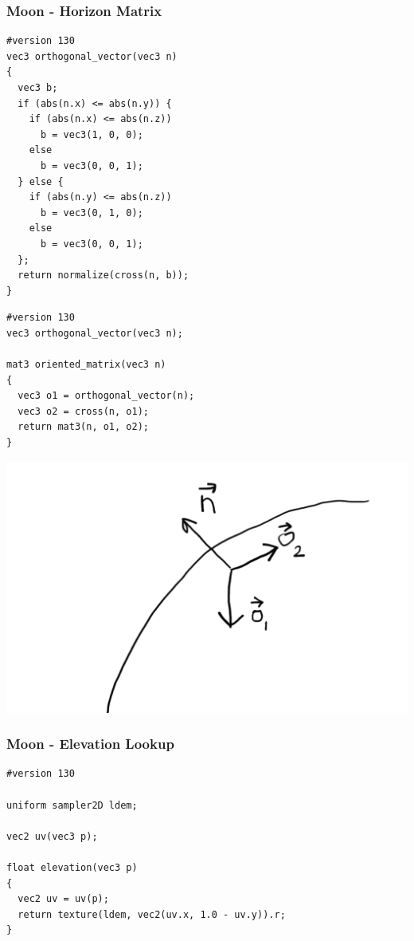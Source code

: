 \documentclass[aspectratio=169,11pt,xcolor=dvipsnames]{beamer}
\begin{document}
\begin{frame}[fragile]
  \frametitle{Moon {-} Horizon Matrix}
  \begin{minipage}[t]{.48\textwidth}
    \begin{verbatim}
#version 130
vec3 orthogonal_vector(vec3 n)
{
  vec3 b;
  if (abs(n.x) <= abs(n.y)) {
    if (abs(n.x) <= abs(n.z))
      b = vec3(1, 0, 0);
    else
      b = vec3(0, 0, 1);
  } else {
    if (abs(n.y) <= abs(n.z))
      b = vec3(0, 1, 0);
    else
      b = vec3(0, 0, 1);
  };
  return normalize(cross(n, b));
}
    \end{verbatim}
  \end{minipage}
  \begin{minipage}[t]{.48\textwidth}
    \begin{verbatim}
#version 130
vec3 orthogonal_vector(vec3 n);

mat3 oriented_matrix(vec3 n)
{
  vec3 o1 = orthogonal_vector(n);
  vec3 o2 = cross(n, o1);
  return mat3(n, o1, o2);
}
    \end{verbatim}
    \begin{center}
      \includegraphics[width=.6\textwidth]{horizon}
    \end{center}
  \end{minipage}
\end{frame}

\begin{frame}[fragile]
  \frametitle{Moon {-} Elevation Lookup}
  \begin{verbatim}
#version 130

uniform sampler2D ldem;

vec2 uv(vec3 p);

float elevation(vec3 p)
{
  vec2 uv = uv(p);
  return texture(ldem, vec2(uv.x, 1.0 - uv.y)).r;
}
  \end{verbatim}
\end{frame}
\end{document}
